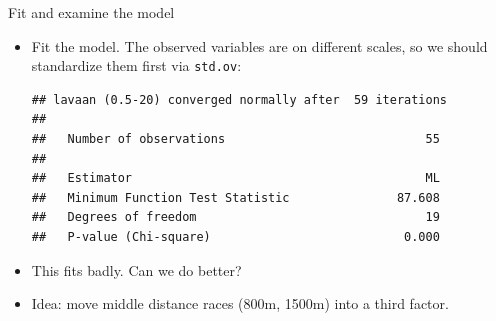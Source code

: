\begin{frame}[fragile]{Fit and examine the model}
  
  \begin{itemize}
\item Fit the model. The observed variables are on different
  scales, so we should standardize them first via \texttt{std.ov}:

{\small  

\begin{knitrout}
\color{fgcolor}\begin{kframe}
\begin{alltt}
\hlkwb{=}\hlstd{=track[,}\hlopt{-}\hlstd{],}
\end{alltt}
\begin{verbatim}
## lavaan (0.5-20) converged normally after  59 iterations
## 
##   Number of observations                            55
## 
##   Estimator                                         ML
##   Minimum Function Test Statistic               87.608
##   Degrees of freedom                                19
##   P-value (Chi-square)                           0.000
\end{verbatim}
\end{kframe}
\end{knitrout}
}

\item This fits badly. Can we do better?
  

\item Idea: move middle distance races (800m, 1500m) into a third factor.
  
  \end{itemize}
  
\end{frame}



